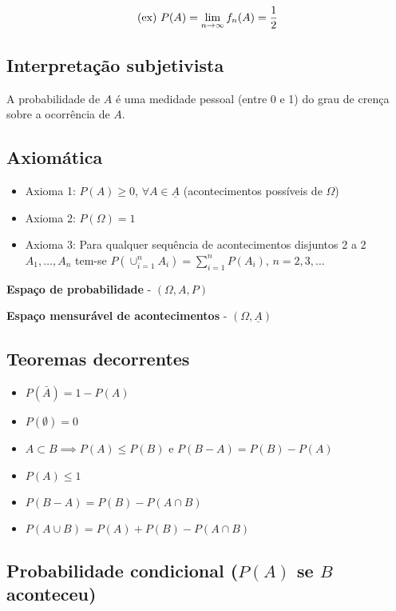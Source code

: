 \documentclass{article}
\begin{document}
$$ \textnormal{(ex) }P(A) = \lim_{n\to\infty}f_n(A)=\frac{1}{2} $$

\subsection{Interpretação subjetivista}

A probabilidade de $A$ é uma medidade pessoal (entre 0 e 1) do grau de crença sobre a ocorrência de $A$.

\subsection{Axiomática}

\begin{itemize}
    \item Axioma 1: $P(A) \geq 0$, $\forall A \in \underline{A}$ (acontecimentos possíveis de $\Omega$)
    \item Axioma 2: $P(\Omega) = 1$
    \item Axioma 3: Para qualquer sequência de acontecimentos disjuntos 2 a 2 $A_1, \dots, A_n$ tem-se $P(\cup_{i=1}^n A_i) = \sum_{i=1}^n P(A_i)$, $n = 2, 3, \dots$
\end{itemize}

\textbf{Espaço de probabilidade} - $(\Omega, A, P)$

\textbf{Espaço mensurável de acontecimentos} - $(\Omega, \underline{A})$

\subsection{Teoremas decorrentes}

\begin{itemize}
    \item $P(\bar{A}) = 1 - P(A)$
    \item $P(\emptyset) = 0$
    \item $A \subset B \implies P(A) \leq P(B)$ e $P(B - A) = P(B) - P(A)$
    \item $P(A) \leq 1$
    \item $P(B - A) = P(B) - P(A \cap B)$
    \item $P(A \cup B) = P(A) + P(B) - P(A \cap B)$
\end{itemize}

\subsection{Probabilidade condicional ($P(A)$ se $B$ aconteceu)}
\end{document}
